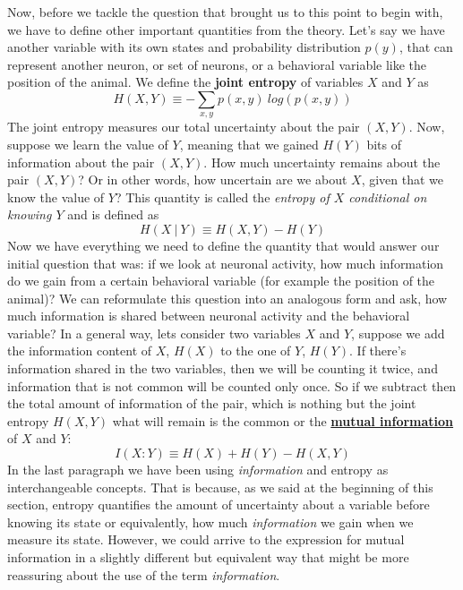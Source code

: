 Now, before we tackle the question that brought us to this point to begin with, we have to define other important quantities from the theory.
Let's say we have another variable with its own states and probability distribution ${p(y)}$, that can represent another neuron, or set of neurons, or a behavioral variable like the position of the animal. 
We define the \textbf{joint entropy} of variables $X$ and $Y$ as
\begin{equation}
    H(X,Y)\equiv-\sum_{x,y}p(x,y)\ log(p(x,y)) 
\end{equation}
The joint entropy measures our total uncertainty about the pair $(X,Y)$.
Now, suppose we learn the value of $Y$, meaning that we gained $H(Y)$ bits of information about the pair $(X,Y)$.
How much uncertainty remains about the pair $(X,Y)$? 
Or in other words, how uncertain are we about $X$, given that we know the value of $Y$?
This quantity is called the \textit{entropy of $X$ conditional on knowing $Y$} and is defined as
\begin{equation}
\label{eqn:condentropy}
    H(X\ |\ Y) \equiv H(X,Y)-H(Y)
\end{equation}
Now we have everything we need to define the quantity that would answer our initial question that was: if we look at neuronal activity, how much information do we gain from a certain behavioral variable (for example the position of the animal)? 
We can reformulate this question into an analogous form and ask, how much information is shared between neuronal activity and the behavioral variable?
In a general way, lets consider two variables $X$ and $Y$, suppose we add the information content of $X$, $H(X)$ to the one of $Y$, $H(Y)$.
If there's information shared in the two variables, then we will be counting it twice, and information that is not common will be counted only once. 
So if we subtract then the total amount of information of the pair, which is nothing but the joint entropy $H(X,Y)$ what will remain is the common or the \underline{\textbf{mutual information}} of $X$ and $Y$:
\begin{equation}
\label{eqn:mutualinfo1}
    I(X:Y)\equiv H(X)+H(Y)-H(X,Y)
\end{equation}
In the last paragraph we have been using \textit{information} and entropy as interchangeable concepts.
That is because, as we said at the beginning of this section, entropy quantifies the amount of uncertainty about a variable before knowing its state or equivalently, how much \textit{information} we gain when we measure its state.
However, we could arrive to the expression for mutual information in a slightly different but equivalent way that might be more reassuring about the use of the term \textit{information}.
